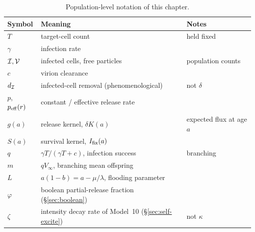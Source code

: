 \begin{table}[H]
\centering
\renewcommand{\arraystretch}{1.25}
\small
\begin{tabular}{@{}llp{}@{}}
\toprule
Symbol & Meaning & Notes \\
\midrule
$T$ & target-cell count & held fixed \\
$\gamma$ & infection rate & \\
$\mathcal{I},\mathcal{V}$ & infected cells, free particles & population counts \\
$c$ & virion clearance & \\
$d_{\mathcal{I}}$ & infected-cell removal (phenomenological) & not $\delta$ \\
$p$, $p_{\rm eff}(r)$ & constant / effective release rate & \\
$g(a)$ & release kernel, $\delta K(a)$ & expected flux at age $a$ \\
$S(a)$ & survival kernel, $I_{\mathrm{fix}}(a)$ & \\
$q$ & $\gamma T/(\gamma T+c)$, infection success & branching \\
$m$ & $qV_\infty$, branching mean offspring & \\
$L$ & $a(1-b)=a-\mu/\lambda$, flooding parameter & \\
$\varphi$ & boolean partial-release fraction (\S\ref{sec:boolean}) & \\
$\zeta$ & intensity decay rate of Model~10 (\S\ref{sec:self-excite}) & not $\kappa$ \\
\bottomrule
\end{tabular}
\caption{Population-level notation of this chapter.}
\label{tab:notation-pop}
\end{table}
